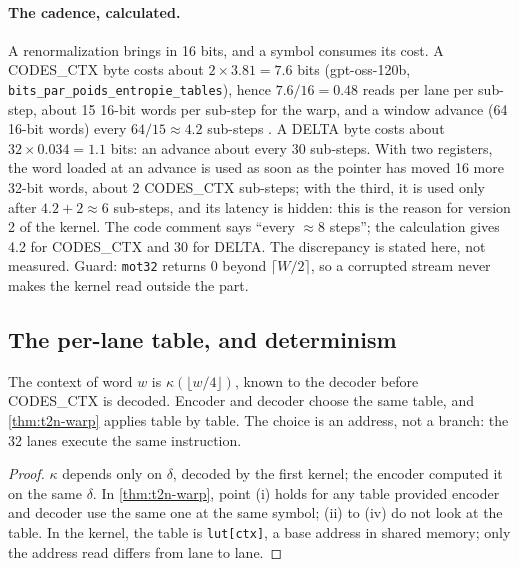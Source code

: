 \paragraph{The cadence, calculated.} A renormalization brings in 16 bits, and a symbol consumes its cost. A CODES\_CTX byte costs about $2 \times 3.81 = 7.6$ bits (gpt-oss-120b, \texttt{bits\_\allowbreak par\_\allowbreak poids\_\allowbreak entropie\_\allowbreak tables}), hence $7.6/16 = 0.48$ reads per lane per sub-step, about 15 16-bit words per sub-step for the warp, and a window advance (64 16-bit words) every $64/15 \approx 4.2$ sub-steps \calc. A DELTA byte costs about $32 \times 0.034 = 1.1$ bits: an advance about every 30 sub-steps. With two registers, the word loaded at an advance is used as soon as the pointer has moved 16 more 32-bit words, about 2 CODES\_CTX sub-steps; with the third, it is used only after $4.2 + 2 \approx 6$ sub-steps, and its latency is hidden: this is the reason for version 2 of the kernel. The code comment says ``every $\approx 8$ steps''; the calculation gives 4.2 for CODES\_CTX and 30 for DELTA. The discrepancy is stated here, not measured. Guard: \texttt{mot32} returns 0 beyond $\lceil W/2 \rceil$, so a corrupted stream never makes the kernel read outside the part.

\subsection{The per-lane table, and determinism}

\begin{proposition}\label{prop:t2n-table-voie}
The context of word $w$ is $\kappa(\lfloor w/4 \rfloor)$, known to the decoder before CODES\_CTX is decoded. Encoder and decoder choose the same table, and \cref{thm:t2n-warp} applies table by table. The choice is an address, not a branch: the 32 lanes execute the same instruction.
\end{proposition}

\begin{proof}
$\kappa$ depends only on $\delta$, decoded by the first kernel; the encoder computed it on the same $\delta$. In \cref{thm:t2n-warp}, point (i) holds for any table provided encoder and decoder use the same one at the same symbol; (ii) to (iv) do not look at the table. In the kernel, the table is \texttt{lut[ctx]}, a base address in shared memory; only the address read differs from lane to lane.
\end{proof}

